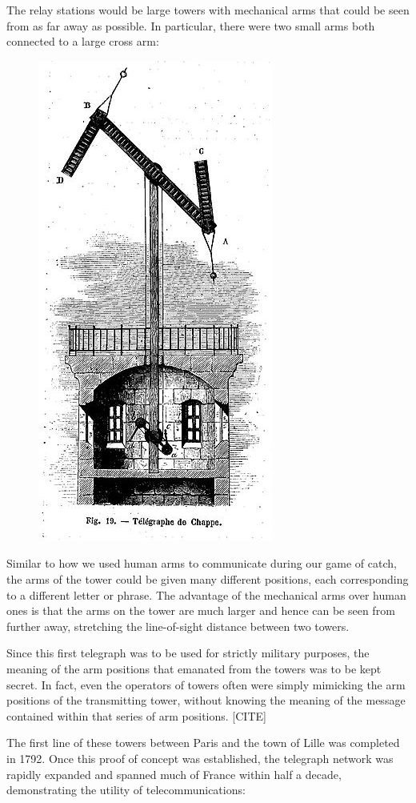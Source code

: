 \documentclass[UTF8]{book}
\begin{document}
\begin{CJK}{UTF8}{gbsn}
The relay stations would be large towers with mechanical arms that could be seen from as far away as possible. In particular, there were two small arms both connected to a large cross arm:

\begin{figure}[H]
\centering
\includegraphics[width=0.3\linewidth]{chappe_tower}
\end{figure}

Similar to how we used human arms to communicate during our game of catch, the arms of the tower could be given many different positions, each corresponding to a different letter or phrase. The advantage of the mechanical arms over human ones is that the arms on the tower are much larger and hence can be seen from further away, stretching the line-of-sight distance between two towers.

Since this first telegraph was to be used for strictly military purposes, the meaning of the arm positions that emanated from the towers was to be kept secret. In fact, even the operators of towers often were simply mimicking the arm positions of the transmitting tower, without knowing the meaning of the message contained within that series of arm positions. [CITE]

The first line of these towers between Paris and the town of Lille was completed in 1792. Once this proof of concept was established, the telegraph network was rapidly expanded and spanned much of France within half a decade, demonstrating the utility of telecommunications:


\end{CJK}
\end{document}
